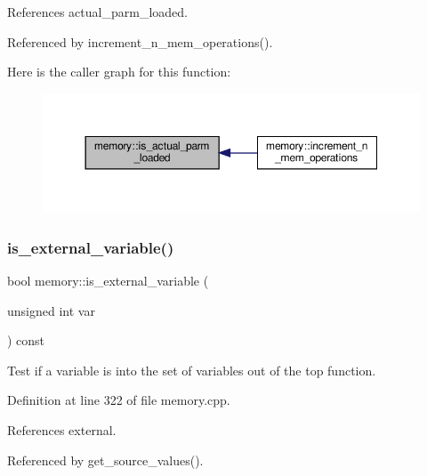 References actual\+\_\+parm\+\_\+loaded.



Referenced by increment\+\_\+n\+\_\+mem\+\_\+operations().

Here is the caller graph for this function\+:
\nopagebreak
\begin{figure}[H]
\begin{center}
\leavevmode
\includegraphics[width=350pt]{d8/d99/classmemory_af12efe6e45e237f9db7bdb650121e3b9_icgraph}
\end{center}
\end{figure}
\mbox{\label{classmemory_a01bcc5c735b622564c5a2498d3547300}} 
\subsubsection{\texorpdfstring{is\+\_\+external\+\_\+variable()}{is\_external\_variable()}}
{\footnotesize\ttfamily bool memory\+::is\+\_\+external\+\_\+variable (\begin{DoxyParamCaption}\item[{unsigned int}]{var }\end{DoxyParamCaption}) const}



Test if a variable is into the set of variables out of the top function. 



Definition at line 322 of file memory.\+cpp.



References external.



Referenced by get\+\_\+source\+\_\+values().

